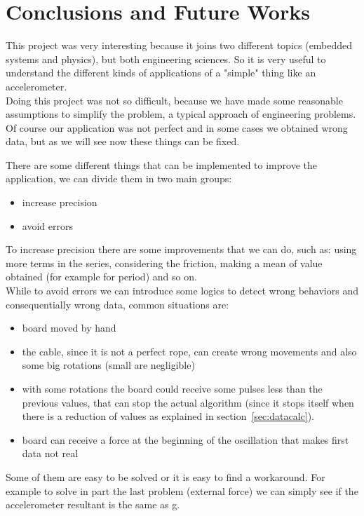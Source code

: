 \section{Conclusions and Future Works}
\label{sec:conclusions}
This project was very interesting because it joins two different topics (embedded systems and physics), but both engineering sciences. So it is very useful to understand the different kinds of applications of a "simple" thing like an accelerometer.\\
Doing this project was not so difficult, because we have made some reasonable assumptions to simplify the problem, a typical approach of engineering problems. Of course our application was not perfect and in some cases we obtained wrong data, but as we will see now these things can be fixed.\par
There are some different things that can be implemented to improve the application, we can divide them in two main groups:
\begin{itemize}
	\item increase precision
	\item avoid errors
\end{itemize}
To increase precision there are some improvements that we can do, such as: using more terms in the series, considering the friction, making a mean of value obtained (for example for period) and so on.\\
While to avoid errors we can introduce some logics to detect wrong behaviors and consequentially wrong data, common situations are:
\begin{itemize}
	\item board moved by hand
	\item the cable, since it is not a perfect rope, can create wrong movements and also some big rotations (small are negligible)
	\item with some rotations the board could receive some pulses less than the previous values, that can stop the actual algorithm (since it stops itself when there is a reduction of values as explained in section~\ref{sec:datacalc}).
	\item board can receive a force at the beginning of the oscillation that makes first data not real
\end{itemize}
Some of them are easy to be solved or it is easy to find a workaround. For example to solve in part the last problem (external force) we can simply see if the accelerometer resultant is the same as g.

